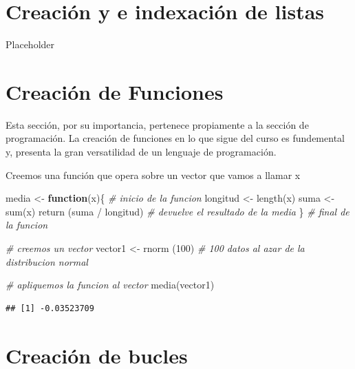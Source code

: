 \documentclass[
]{book}
\newenvironment{Shaded}{\begin{snugshade}}{\end{snugshade}}
\newcommand{\CommentTok}[1]{\textcolor[rgb]{0.56,0.35,0.01}{\textit{#1}}}
\newcommand{\ControlFlowTok}[1]{\textcolor[rgb]{0.13,0.29,0.53}{\textbf{#1}}}
\newcommand{\DecValTok}[1]{\textcolor[rgb]{0.00,0.00,0.81}{#1}}
\newcommand{\FunctionTok}[1]{\textcolor[rgb]{0.00,0.00,0.00}{#1}}
\newcommand{\NormalTok}[1]{#1}
\newcommand{\OtherTok}[1]{\textcolor[rgb]{0.56,0.35,0.01}{#1}}
\newcommand{\SpecialCharTok}[1]{\textcolor[rgb]{0.00,0.00,0.00}{#1}}
\begin{document}
\hypertarget{creaciuxf3n-y-e-indexaciuxf3n-de-listas}{%
\chapter{Creación y e indexación de listas}\label{creaciuxf3n-y-e-indexaciuxf3n-de-listas}}

Placeholder

\hypertarget{creaciuxf3n-de-funciones}{%
\chapter{Creación de Funciones}\label{creaciuxf3n-de-funciones}}

Esta sección, por su importancia, pertenece propiamente a la sección de programación. La creación de funciones en lo que sigue del curso es fundemental y, presenta la gran versatilidad de un lenguaje de programación.

Creemos una función que opera sobre un vector que vamos a llamar x

\begin{Shaded}
\begin{Highlighting}[]
\NormalTok{media }\OtherTok{\textless{}{-}} \ControlFlowTok{function}\NormalTok{(x)\{     }\CommentTok{\# inicio de la funcion}
\NormalTok{ longitud }\OtherTok{\textless{}{-}} \FunctionTok{length}\NormalTok{(x)}
\NormalTok{ suma }\OtherTok{\textless{}{-}} \FunctionTok{sum}\NormalTok{(x)}
 \FunctionTok{return}\NormalTok{ (suma }\SpecialCharTok{/}\NormalTok{ longitud) }\CommentTok{\# devuelve el resultado de la media}
\NormalTok{\}                         }\CommentTok{\# final de la funcion}


\CommentTok{\# creemos un vector}
\NormalTok{vector1 }\OtherTok{\textless{}{-}} \FunctionTok{rnorm}\NormalTok{ (}\DecValTok{100}\NormalTok{) }\CommentTok{\# 100 datos al azar de la distribucion normal}

\CommentTok{\# apliquemos la funcion al vector}
\FunctionTok{media}\NormalTok{(vector1)}
\end{Highlighting}
\end{Shaded}

\begin{verbatim}
## [1] -0.03523709
\end{verbatim}

\hypertarget{creaciuxf3n-de-bucles}{%
\chapter{Creación de bucles}\label{creaciuxf3n-de-bucles}}
\end{document}
